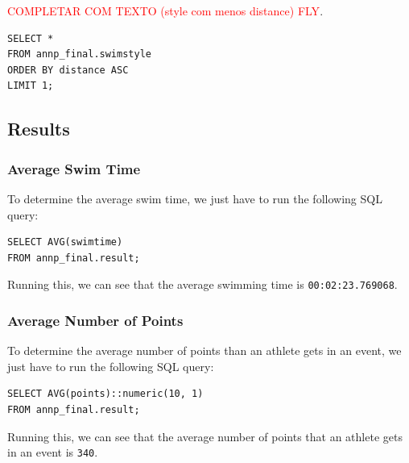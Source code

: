 \textcolor{red}{COMPLETAR COM TEXTO (style com menos distance) FLY}.

\begin{verbatim}
SELECT *
FROM annp_final.swimstyle
ORDER BY distance ASC
LIMIT 1;
\end{verbatim}

\subsection{Results}

\subsubsection{Average Swim Time}

To determine the average swim time, we just have to run the following SQL query:

\begin{verbatim}
SELECT AVG(swimtime)
FROM annp_final.result;
\end{verbatim}

Running this, we can see that the average swimming time is \texttt{00:02:23.769068}.

\subsubsection{Average Number of Points}

To determine the average number of points than an athlete gets in an event, we just have to run the following SQL
query:

\begin{verbatim}
SELECT AVG(points)::numeric(10, 1)
FROM annp_final.result;
\end{verbatim}

Running this, we can see that the average number of points that an athlete gets in an event is \texttt{340}.